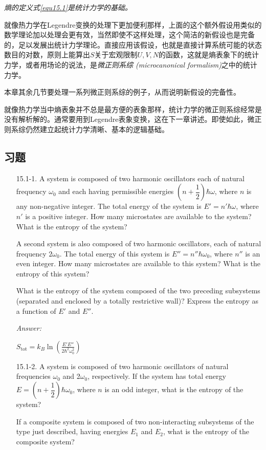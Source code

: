 {\it 熵的定义式\eqref{equ15.1}是统计力学的基础。}

就像热力学在Legendre变换的处理下更加便利那样，上面的这个额外假设用类似的数学理论加以处理会更有效，当然即使不这样处理，这个简洁的新假设也是完备的，足以发展出统计力学理论。直接应用该假设，也就是直接计算系统可能的状态数目的对数，原则上能算出$S$关于宏观限制$U, V, N$的函数，这就是熵表象下的统计力学，或者用场论的说法，是{\it 微正则系综 (microcanonical formalism)}之中的统计力学。 

本章其余几节要处理一系列微正则系综的例子，从而说明新假设的完备性。

就像热力学当中熵表象并不总是最方便的表象那样，统计力学的微正则系综经常是没有解析解的。通常要用到Legendre表象变换，这在下一章讲述。即使如此，微正则系综仍然建立起统计力学清晰、基本的逻辑基础。

\subsection*{习题}
\begin{itemize}
\item[15.1-1.] A system is composed of two harmonic oscillators each of natural frequency $\omega_0$ and each having permissible energies $(n + \dfrac{1}{2}) \hbar \omega$, where $n$ is any non-negative integer. The total energy of the system is $E' = n' \hbar \omega$, where $n'$ is a
positive integer. How many microstates are available to the system? What is the entropy of the system?

A second system is also composed of two harmonic oscillators, each of natural frequency $2\omega_0$. The total energy of this system is $E'' = n'' \hbar \omega_0$, where $n''$ is an even integer. How many microstates are available to this system? What is the entropy of this system? 

What is the entropy of the system composed of the two preceding subsystems (separated and enclosed by a totally restrictive wall)? Express the entropy as a function of $E'$ and $E''$.

\begin{flushright}
{\it Answer:}

${\displaystyle S_{\text{tot}} = k_B \ln \left( \frac{E' E''}{2\hbar^2 \omega_0^2} \right) }$
\end{flushright}

\item[15.1-2.] A system is composed of two harmonic oscillators of natural frequencies $\omega_0$ and 2$\omega_0$, respectively. If the system has total energy $E = (n + \dfrac{1}{2}) \hbar \omega_0$, where $n$ is an odd integer, what is the entropy of the system?

If a composite system is composed of two non-interacting subsystems of the type just described, having energies $E_1$ and $E_2$, what is the entropy of the composite system?
\end{itemize}


